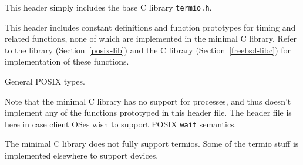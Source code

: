 \label{sys-termios-h}
\begin{apidesc}
	This header simply includes the base C library \texttt{termio.h}.
\end{apidesc}

\label{sys-time-h}
\begin{apidesc}
	This header includes constant definitions and function prototypes for
	timing and related functions, none of which are implemented in the
	minimal C library. Refer to the \posix{} library
	(Section~\ref{posix-lib}) and the \freebsd{} C library
	(Section~\ref{freebsd-libc}) for implementation of these functions.
\end{apidesc}

\label{sys-types-h}
\begin{apidesc}
	General POSIX types.
\end{apidesc}

\label{sys-wait-h}
\begin{apidesc}
	Note that the minimal
	C library has no support for processes, and thus
	doesn't implement any of the functions prototyped 
	in this header file.  
	The header file is here in case client OSes wish to
	support POSIX \texttt{wait} semantics.
\end{apidesc}		

\label{termios-h}
\begin{apidesc}
	The minimal C library does not fully support termios.  Some of the
	termio stuff is implemented elsewhere to support \oskit{} devices.
\end{apidesc}

